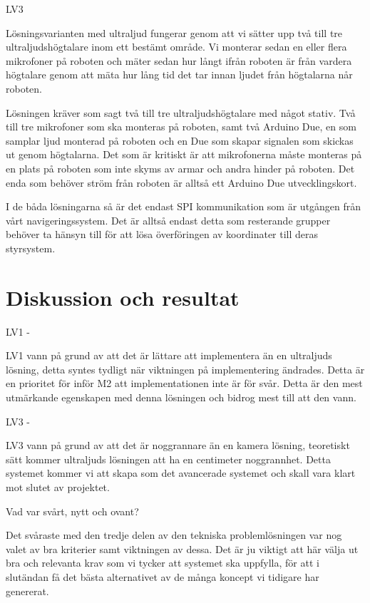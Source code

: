 \documentclass[11pt, a4paper]{report}
\begin{document}
LV3

Lösningsvarianten med ultraljud fungerar genom att vi sätter upp två till tre ultraljudshögtalare inom ett bestämt område. Vi monterar sedan en eller flera mikrofoner på roboten och mäter sedan hur långt ifrån roboten är från vardera högtalare genom att mäta hur lång tid det tar innan ljudet från högtalarna når roboten.

Lösningen kräver som sagt två till tre ultraljudshögtalare med något stativ. Två till tre mikrofoner som ska monteras på roboten, samt två Arduino Due, en som samplar ljud monterad på roboten och en Due som skapar signalen som skickas ut genom högtalarna.
Det som är kritiskt är att mikrofonerna måste monteras på en plats på roboten som inte skyms av armar och andra hinder på roboten.
Det enda som behöver ström från roboten är alltså ett Arduino Due utvecklingskort.


I de båda lösningarna så är det endast SPI kommunikation som är utgången från vårt navigeringssystem. Det är alltså endast detta som resterande grupper behöver ta hänsyn till för att lösa överföringen av koordinater till deras styrsystem.

\section{Diskussion och resultat}

LV1 -

LV1 vann på grund av att det är lättare att implementera än en ultraljuds lösning, detta syntes tydligt när viktningen på implementering ändrades. Detta är en prioritet för inför M2 att implementationen inte är för svår. Detta är den mest utmärkande egenskapen med denna lösningen och bidrog mest till att den vann. 

LV3 -

LV3 vann på grund av att det är noggrannare än en kamera lösning, teoretiskt sätt kommer ultraljuds lösningen att ha en centimeter noggrannhet. Detta systemet kommer vi att skapa som det avancerade systemet och skall vara klart mot slutet av projektet.



Vad var svårt, nytt och ovant?

Det svåraste med den tredje delen av den tekniska problemlösningen var nog valet av bra kriterier samt viktningen av dessa. Det är ju viktigt att här välja ut bra och relevanta krav som vi tycker att systemet ska uppfylla, för att i slutändan få det bästa alternativet av de många koncept vi tidigare har genererat.
\end{document}
